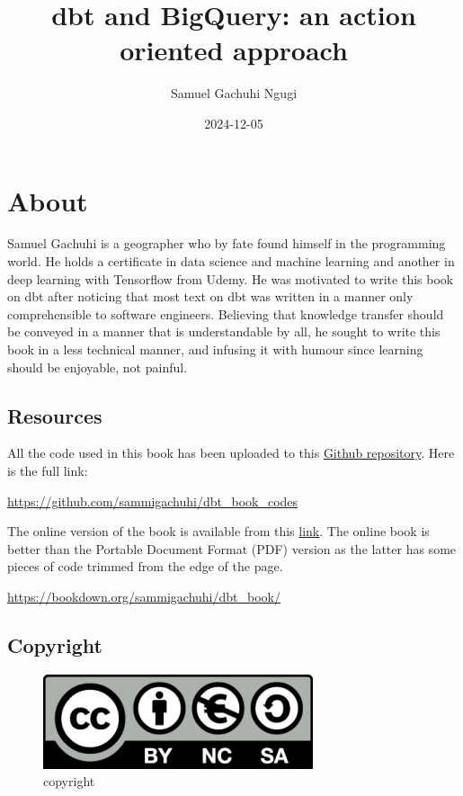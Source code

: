 \documentclass[
]{book}
\title{dbt and BigQuery: an action oriented approach}
\author{Samuel Gachuhi Ngugi}
\date{2024-12-05}
\begin{document}
\maketitle

{
\setcounter{tocdepth}{1}
\tableofcontents
}
\hypertarget{about}{%
\chapter{About}\label{about}}

Samuel Gachuhi is a geographer who by fate found himself in the programming world. He holds a certificate in data science and machine learning and another in deep learning with Tensorflow from Udemy. He was motivated to write this book on dbt after noticing that most text on dbt was written in a manner only comprehensible to software engineers. Believing that knowledge transfer should be conveyed in a manner that is understandable by all, he sought to write this book in a less technical manner, and infusing it with humour since learning should be enjoyable, not painful.

\hypertarget{resources}{%
\section{Resources}\label{resources}}

All the code used in this book has been uploaded to this \href{https://github.com/sammigachuhi/dbt_book_codes}{Github repository}. Here is the full link:

\url{https://github.com/sammigachuhi/dbt_book_codes}

The online version of the book is available from this \href{https://bookdown.org/sammigachuhi/dbt_book/}{link}. The online book is better than the Portable Document Format (PDF) version as the latter has some pieces of code trimmed from the edge of the page.

\url{https://bookdown.org/sammigachuhi/dbt_book/}

\hypertarget{copyright}{%
\section{Copyright}\label{copyright}}

\begin{figure}
\centering
\includegraphics{./images/copyright.png}
\caption{copyright}
\end{figure}
\end{document}
